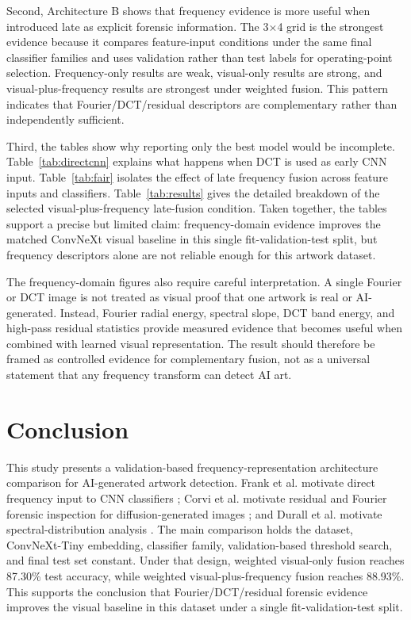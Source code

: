 ﻿\documentclass[10pt,twocolumn]{article}
\begin{document}
Second, Architecture B shows that frequency evidence is more useful when introduced late as explicit forensic information. The 3\(\times\)4 grid is the strongest evidence because it compares feature-input conditions under the same final classifier families and uses validation rather than test labels for operating-point selection. Frequency-only results are weak, visual-only results are strong, and visual-plus-frequency results are strongest under weighted fusion. This pattern indicates that Fourier/DCT/residual descriptors are complementary rather than independently sufficient.

Third, the tables show why reporting only the best model would be incomplete. Table~\ref{tab:directcnn} explains what happens when DCT is used as early CNN input. Table~\ref{tab:fair} isolates the effect of late frequency fusion across feature inputs and classifiers. Table~\ref{tab:results} gives the detailed breakdown of the selected visual-plus-frequency late-fusion condition. Taken together, the tables support a precise but limited claim: frequency-domain evidence improves the matched ConvNeXt visual baseline in this single fit-validation-test split, but frequency descriptors alone are not reliable enough for this artwork dataset.

The frequency-domain figures also require careful interpretation. A single Fourier or DCT image is not treated as visual proof that one artwork is real or AI-generated. Instead, Fourier radial energy, spectral slope, DCT band energy, and high-pass residual statistics provide measured evidence that becomes useful when combined with learned visual representation. The result should therefore be framed as controlled evidence for complementary fusion, not as a universal statement that any frequency transform can detect AI art.

\section{Conclusion}
This study presents a validation-based frequency-representation architecture comparison for AI-generated artwork detection. Frank et al. motivate direct frequency input to CNN classifiers \cite{frank}; Corvi et al. motivate residual and Fourier forensic inspection for diffusion-generated images \cite{corvi}; and Durall et al. motivate spectral-distribution analysis \cite{durall}. The main comparison holds the dataset, ConvNeXt-Tiny embedding, classifier family, validation-based threshold search, and final test set constant. Under that design, weighted visual-only fusion reaches 87.30\% test accuracy, while weighted visual-plus-frequency fusion reaches 88.93\%. This supports the conclusion that Fourier/DCT/residual forensic evidence improves the visual baseline in this dataset under a single fit-validation-test split.
\end{document}
